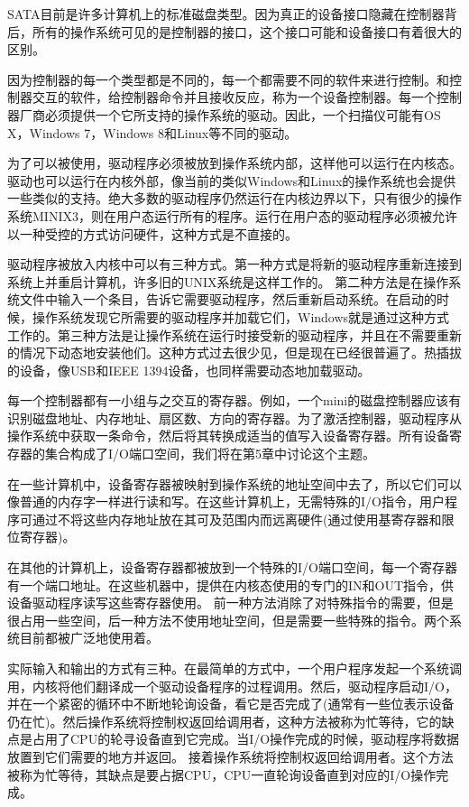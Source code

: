 	SATA目前是许多计算机上的标准磁盘类型。因为真正的设备接口隐藏在控制器背后，所有的操作系统可见的是控制器的接口，这个接口可能和设备接口有着很大的区别。
	
	因为控制器的每一个类型都是不同的，每一个都需要不同的软件来进行控制。和控制器交互的软件，给控制器命令并且接收反应，称为一个设备控制器。每一个控制器厂商必须提供一个它所支持的操作系统的驱动。因此，一个扫描仪可能有OS X，Windows 7，Windows 8和Linux等不同的驱动。
	
	为了可以被使用，驱动程序必须被放到操作系统内部，这样他可以运行在内核态。驱动也可以运行在内核外部，像当前的类似Windows和Linux的操作系统也会提供一些类似的支持。绝大多数的驱动程序仍然运行在内核边界以下，只有很少的操作系统MINIX3，则在用户态运行所有的程序。运行在用户态的驱动程序必须被允许以一种受控的方式访问硬件，这种方式是不直接的。
	
	驱动程序被放入内核中可以有三种方式。第一种方式是将新的驱动程序重新连接到系统上并重启计算机，许多旧的UNIX系统是这样工作的。 第二种方法是在操作系统文件中输入一个条目，告诉它需要驱动程序，然后重新启动系统。在启动的时候，操作系统发现它所需要的驱动程序并加载它们，Windows就是通过这种方式工作的。第三种方法是让操作系统在运行时接受新的驱动程序，并且在不需要重新的情况下动态地安装他们。这种方式过去很少见，但是现在已经很普遍了。热插拔的设备，像USB和IEEE 1394设备，也同样需要动态地加载驱动。
	
	每一个控制器都有一小组与之交互的寄存器。例如，一个mini的磁盘控制器应该有识别磁盘地址、内存地址、扇区数、方向的寄存器。为了激活控制器，驱动程序从操作系统中获取一条命令，然后将其转换成适当的值写入设备寄存器。所有设备寄存器的集合构成了I/O端口空间，我们将在第5章中讨论这个主题。 

	在一些计算机中，设备寄存器被映射到操作系统的地址空间中去了，所以它们可以像普通的内存字一样进行读和写。在这些计算机上，无需特殊的I/O指令，用户程序可通过不将这些内存地址放在其可及范围内而远离硬件(通过使用基寄存器和限位寄存器)。 
	
	在其他的计算机上，设备寄存器都被放到一个特殊的I/O端口空间，每一个寄存器有一个端口地址。在这些机器中，提供在内核态使用的专门的IN和OUT指令，供设备驱动程序读写这些寄存器使用。
	前一种方法消除了对特殊指令的需要，但是很占用一些空间，后一种方法不使用地址空间，但是需要一些特殊的指令。两个系统目前都被广泛地使用着。
	
	实际输入和输出的方式有三种。在最简单的方式中，一个用户程序发起一个系统调用，内核将他们翻译成一个驱动设备程序的过程调用。然后，驱动程序启动I/O，并在一个紧密的循环中不断地轮询设备，看它是否完成了(通常有一些位表示设备仍在忙)。然后操作系统将控制权返回给调用者，这种方法被称为忙等待，它的缺点是占用了CPU的轮寻设备直到它完成。当I/O操作完成的时候，驱动程序将数据放置到它们需要的地方并返回。
	接着操作系统将控制权返回给调用者。这个方法被称为忙等待，其缺点是要占据CPU，CPU一直轮询设备直到对应的I/O操作完成。
	
